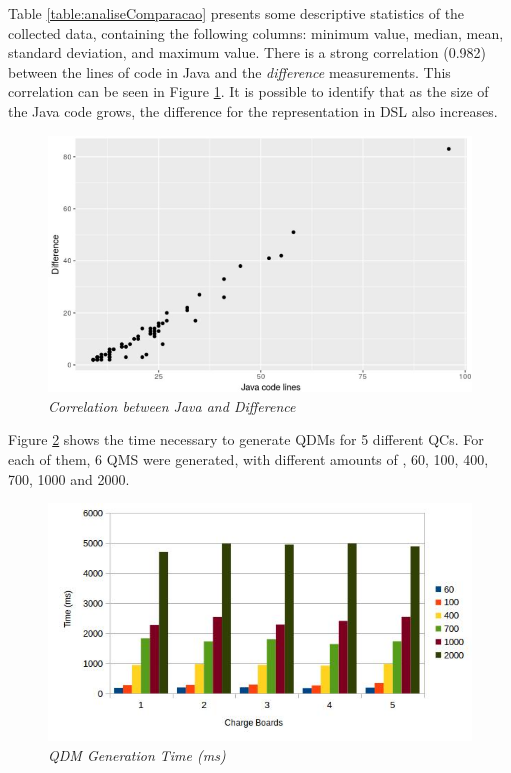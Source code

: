 
Table \ref{table:analiseComparacao} presents some descriptive statistics 
of the collected data, containing the following columns: minimum value, median, mean, standard deviation, and maximum value. 
There is a strong correlation (0.982) between the lines of code in Java and the \emph{difference} measurements. 
This correlation can be seen in Figure \ref{fig:correlacao}. It is possible to identify that as the size of the Java code grows, 
the difference for the representation in DSL also increases.

\begin{figure}[htb!] 
\centering
  \includegraphics[width=.48\textwidth]
  {img/artigo_correlacao.jpg}
  \caption{\it Correlation between Java and Difference}
  \label{fig:correlacao}
\end{figure}

Figure \ref{fig:geracao} shows the time necessary to generate QDMs for 5 different QCs. For each of them, 
6 QMS were generated, with different amounts of \callers, 60, 100, 400, 700, 1000 and 2000.

\begin{figure}[!ht] \centering
  \includegraphics[width=.48\textwidth]
  {img/artigo_geracao.jpg}
  \caption{\it QDM Generation Time (ms)}
  \label{fig:geracao}
\end{figure}

